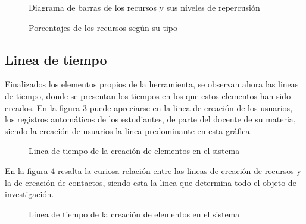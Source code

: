 \begin{figure}
\centering

\caption{Diagrama de barras de los recursos y sus niveles de repercusión}
\label{recursos_bars_1}
\end{figure}

\begin{figure}
\centering

\caption{Porcentajes de los recursos según su tipo}
\label{recursos_pie_1}
\end{figure}

\subsection{Linea de tiempo}
Finalizados los elementos propios de la herramienta, se observan ahora las
lineas de tiempo, donde se presentan los tiempos en los que estos elementos han
sido creados.
En la figura \ref{tiempos_area_1} puede apreciarse en la linea de creación de
los usuarios, los registros automáticos de los estudiantes, de parte del
docente de su materia, siendo la creación de usuarios la linea predominante en
esta gráfica.

\begin{figure}
\centering

\caption{Linea de tiempo de la creación de elementos en el sistema}
\label{tiempos_area_1}
\end{figure}

En la figura \ref{tiempos_area_2} resalta la curiosa relación entre las lineas
de creación de recursos y la de creación de contactos, siendo esta la linea que
determina todo el objeto de investigación.

\begin{figure}[H]
\centering

\caption{Linea de tiempo de la creación de elementos en el sistema}
\label{tiempos_area_2}
\end{figure}


